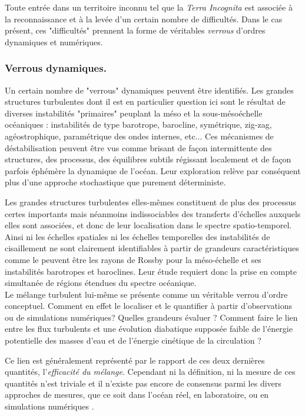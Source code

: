Toute entrée dans un territoire inconnu tel que la \textit{Terra Incognita} est associée à la reconnaissance et à la levée d'un certain nombre de difficultés. Dans le cas présent, ces "difficultés" prennent la forme de véritables \textit{verrous} d'ordres dynamiques et numériques.

\subsubsection{Verrous dynamiques.}
Un certain nombre de "verrous" dynamiques peuvent être identifiés. Les grandes structures turbulentes dont il est en particulier question ici sont le résultat de diverses instabilités "primaires" peuplant la méso et la sous-mésoéchelle océaniques : instabilités de type barotrope, barocline, symétrique, zig-zag, agéostrophique, paramétrique des ondes internes, etc... Ces mécanismes de déstabilisation peuvent être vus comme brisant de façon intermittente des structures, des processus, des équilibres subtils régissant localement et de façon parfois éphémère la dynamique de l'océan. Leur exploration relève par conséquent plus d'une approche stochastique que purement déterministe.

Les grandes structures turbulentes elles-mêmes constituent de plus des processus certes importants mais néanmoins indissociables des transferts d'échelles auxquels elles sont associées, et donc de leur localisation dans le spectre spatio-temporel. 
Ainsi ni les échelles spatiales ni les échelles temporelles des instabilités de cisaillement ne sont clairement identifiables à partir de grandeurs caractéristiques comme le peuvent être les rayons de Rossby pour la méso-échelle et ses instabilités barotropes et baroclines. Leur étude requiert donc la prise en compte simultanée de régions étendues du spectre océanique.\\

Le mélange turbulent lui-même se présente comme un véritable verrou d'ordre conceptuel. Comment en effet le localiser et le quantifier à partir d'observations ou de simulations numériques? Quelles grandeurs évaluer ? 
Comment faire le lien entre les flux turbulents et une évolution diabatique supposée faible de l'énergie potentielle des masses d'eau et de l'énergie cinétique de la circulation ? 

Ce lien est généralement représenté par le rapport de ces deux dernières quantités, l'\textit{efficacité du mélange}. Cependant ni la définition, ni la mesure de ces quantités n'est triviale et il n'existe pas encore de consensus parmi les divers approches de mesures, que ce soit dans l'océan réel, en laboratoire, ou en simulations numériques \citep{gregg_2018}. 

